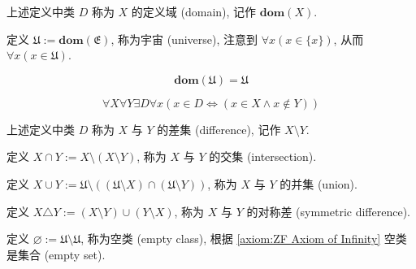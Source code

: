 \begin{definition}
    \label {definition:domain}
    上述定义中类 \(D\) 称为 \(X\) 的定义域 (domain), 记作 \(\mathbf{dom} (X)\).
\end{definition}

\begin{definition}
    \label {definition:universe}
    定义 \(\mathfrak{U} := \mathbf{dom} (\mathfrak{E})\), 称为宇宙 (universe), 注意到 \(\forall x (x \in \{x\})\),
    从而 \(\forall x (x \in \mathfrak{U})\).
\end{definition}

\begin{corollary}
    \[
        \mathbf{dom} (\mathfrak{U}) = \mathfrak{U}
    \]
\end{corollary}

\begin{axiom}
    \label {axiom:NBG Axiom of Difference}
    \[
        \forall X \forall Y \exists D \forall x (x \in D \Leftrightarrow (x \in X \land x \notin Y))
    \]
\end{axiom}

\begin{definition}
    \label {definition:difference of two classes}
    上述定义中类 \(D\) 称为 \(X\) 与 \(Y\) 的差集 (difference), 记作 \(X \setminus Y\).
\end{definition}

\begin{definition}
    \label {definition:intersection of two classes}
    定义 \(X \cap Y := X \setminus (X \setminus Y)\), 称为 \(X\) 与 \(Y\) 的交集 (intersection).
\end{definition}

\begin{definition}
    \label {definition:union of two classes}
    定义 \(X \cup Y := \mathfrak{U} \setminus ((\mathfrak{U} \setminus X) \cap (\mathfrak{U} \setminus Y))\), 称为 \(X\) 与 \(Y\) 的并集 (union).
\end{definition}

\begin{definition}
    \label {definition:symmetric difference of two classes}
    定义 \(X \triangle Y := (X \setminus Y) \cup (Y \setminus X)\), 称为 \(X\) 与 \(Y\) 的对称差 (symmetric difference).
\end{definition}

\begin{definition}
    \label {definition:empty class}
    定义 \(\varnothing := \mathfrak{U} \setminus \mathfrak{U}\), 称为空类 (empty class), 根据 \ref{axiom:ZF Axiom of Infinity} 空类是集合 (empty set).
\end{definition}

